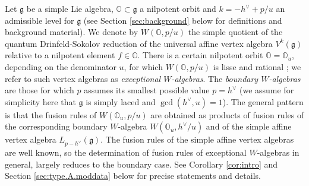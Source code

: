 \documentclass[12pt]{amsart}
\theoremstyle{plain}
\theoremstyle{definition}
\numberwithin{equation}{section}
\newcommand{\g}{\mathfrak{g}}
\newcommand{\mbo}{\mathbb{O}}
\begin{document}
Let $\g$ be a simple Lie algebra, $\mbo \subset \g$ a nilpotent orbit and $k = -h^\vee + p/u$ an admissible level for $\g$ (see Section \ref{sec:background} below for definitions and background material). We denote by $W(\mbo, p/u)$ the simple quotient of the quantum Drinfeld-Sokolov reduction of the universal affine vertex algebra $V^k(\g)$ relative to a nilpotent element $f \in \mbo$. There is a certain nilpotent orbit $\mbo = \mbo_u$, depending on the denominator $u$, for which $W(\mbo, p/u)$ is lisse \cite{Arakawa2015} and rational \cite{AE2023, McRae2021}; we refer to such vertex algebras as \emph{exceptional $W$-algebras}. The \emph{boundary $W$-algebras} are those for which $p$ assumes its smallest possible value $p = h^\vee$ (we assume for simplicity here that $\g$ is simply laced and $\gcd(h^\vee, u) = 1$). The general pattern is that the fusion rules of $W(\mbo_u, p/u)$ are obtained as products of fusion rules of the corresponding boundary $W$-algebra $W(\mbo_u, h^\vee/u)$ and of the simple affine vertex algebra $L_{p-h^\vee}(\g)$. The fusion rules of the simple affine vertex algebras are well known, so the determination of fusion rules of exceptional $W$-algebras in general, largely reduces to the boundary case. See Corollary \ref{cor:intro} and Section \ref{sec:type.A.moddata} below for precise statements and details.
\end{document}
